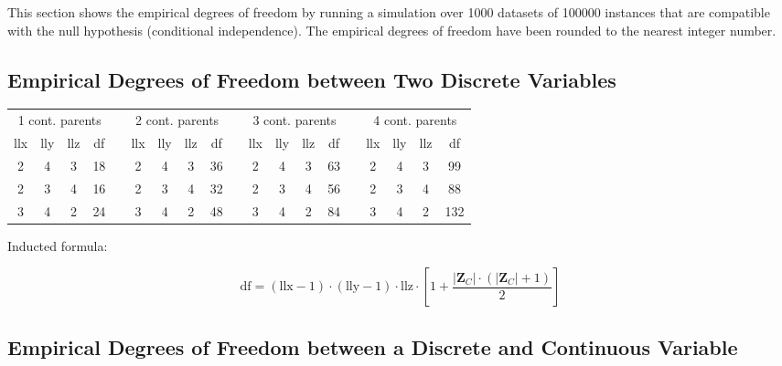 \documentclass[12pt]{article}
\newcommand{\zc}{\mathbf{Z}_C}
\begin{document}
This section shows the empirical degrees of freedom by running a simulation over 1000 datasets of 100000 instances that are compatible with the null hypothesis (conditional independence). The empirical degrees of freedom have been rounded to the nearest integer number.

\subsection{Empirical Degrees of Freedom between Two Discrete Variables}

\begin{table}[h]
\begin{center}
\begin{tabular}{ccccccccccccccccccc}
\multicolumn{4}{c}{1 cont. parents} & &\multicolumn{4}{c}{2 cont. parents} & &\multicolumn{4}{c}{3 cont. parents} & & \multicolumn{4}{c}{4 cont. parents}\\
llx & lly & llz & df & & llx & lly  & llz & df & & llx & lly & llz & df & & llx & lly  & llz & df\\
2 & 4 & 3 & 18 & & 2 & 4 & 3 & 36 & & 2 & 4 & 3 & 63 & & 2 & 4 & 3 & 99\\
2 & 3 & 4 & 16 & & 2 & 3 & 4 & 32 & & 2 & 3 & 4 & 56 & & 2 & 3 & 4 & 88\\
3 & 4 & 2 & 24 & & 3 & 4 & 2 & 48 & & 3 & 4 & 2 & 84 & & 3 & 4 & 2 & 132
\end{tabular}
\end{center}
\end{table}

Inducted formula:

\begin{equation}
\text{df} = (\text{llx} - 1)\cdot(\text{lly} - 1)\cdot\text{llz}\cdot\left[1 + \frac{\lvert\zc\rvert\cdot(\lvert\zc\rvert + 1)}{2}\right]
\end{equation}


\subsection{Empirical Degrees of Freedom between a Discrete and Continuous Variable}
\end{document}
